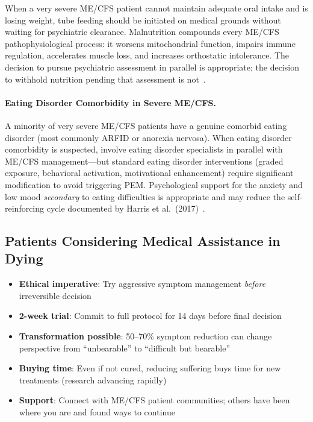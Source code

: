 \begin{warning}
\label{warn:tube-feeding-delay}
When a very severe ME/CFS patient cannot maintain adequate oral intake and is losing weight, tube feeding should be initiated on medical grounds without waiting for psychiatric clearance. Malnutrition compounds every ME/CFS pathophysiological process: it worsens mitochondrial function, impairs immune regulation, accelerates muscle loss, and increases orthostatic intolerance. The decision to pursue psychiatric assessment in parallel is appropriate; the decision to withhold nutrition pending that assessment is not~\cite{Baxter2021malnutrition}.
\end{warning}

\paragraph{Eating Disorder Comorbidity in Severe ME/CFS.}
A minority of very severe ME/CFS patients have a genuine comorbid eating disorder (most commonly ARFID or anorexia nervosa). When eating disorder comorbidity is suspected, involve eating disorder specialists in parallel with ME/CFS management---but standard eating disorder interventions (graded exposure, behavioral activation, motivational enhancement) require significant modification to avoid triggering PEM. Psychological support for the anxiety and low mood \emph{secondary} to eating difficulties is appropriate and may reduce the self-reinforcing cycle documented by Harris et al.\ (2017)~\cite{Harris2017eating}.

\subsection{Patients Considering Medical Assistance in Dying}

\begin{itemize}
    \item \textbf{Ethical imperative}: Try aggressive symptom management \emph{before} irreversible decision
    \item \textbf{2-week trial}: Commit to full protocol for 14 days before final decision
    \item \textbf{Transformation possible}: 50--70\% symptom reduction can change perspective from ``unbearable'' to ``difficult but bearable''
    \item \textbf{Buying time}: Even if not cured, reducing suffering buys time for new treatments (research advancing rapidly)
    \item \textbf{Support}: Connect with ME/CFS patient communities; others have been where you are and found ways to continue
\end{itemize}

